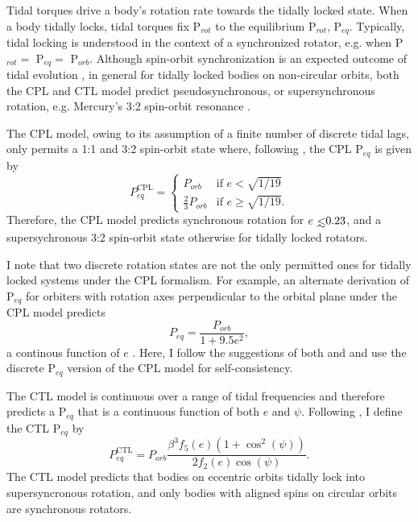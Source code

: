 Tidal torques drive a body's rotation rate towards the tidally locked state. When a body tidally locks, tidal torques fix P$_{rot}$ to the equilibrium P$_{rot}$, P$_{eq}$.  Typically, tidal locking is understood in the context of a synchronized rotator, e.g. when P$_{rot} = $ P$_{eq} = $ P$_{orb}$. Although spin-orbit synchronization is an expected outcome of tidal evolution \citep{Counselman1973}, in general for tidally locked bodies on non-circular orbits, both the CPL and CTL model predict pseudosynchronous, or supersynchronous rotation, e.g. Mercury's 3:2 spin-orbit resonance \citep[P$_{rot} = 2/3$ P$_{orb}$,][]{GoldreichPeale1966}.   

The CPL model, owing to its assumption of a finite number of discrete tidal lags, only permits a 1:1 and 3:2 spin-orbit state where, following \citet{Barnes2017}, the CPL P$_{eq}$ is given by
\begin{equation} \label{sync:eqn:cpl:eqPer}
P^{\mathrm{CPL}}_{eq} = 
\begin{cases}
P_{orb} & \text{if } e < \sqrt{1/19}\\
\frac{2}{3}P_{orb} & \text{if } e \geq \sqrt{1/19}.
\end{cases}
\end{equation}
Therefore, the CPL model predicts synchronous rotation for $e \lsim 0.23$, and a supersychronous 3:2 spin-orbit state otherwise for tidally locked rotators.

I note that two discrete rotation states are not the only permitted ones for tidally locked systems under the CPL formalism. For example, an alternate derivation of P$_{eq}$ for orbiters with rotation axes perpendicular to the orbital plane under the CPL model predicts
\begin{equation} \label{sync:eqn:cpl:eqPerCont}
P_{eq} = \frac{P_{orb}}{1 + 9.5e^2},
\end{equation}
a continous function of $e$ \citep{Goldreich1966b,Murray1999}. Here, I follow the suggestions of both \citet{Barnes2013} and \citet{Barnes2017} and use the discrete P$_{eq}$ version of the CPL model for self-consistency.

The CTL model is continuous over a range of tidal frequencies and therefore predicts a P$_{eq}$ that is a continuous function of both $e$ and $\psi$.  Following \citet{Barnes2017}, I define the CTL P$_{eq}$ by
\begin{equation} \label{sync:eqn:ctl:eqPer}
P^{\mathrm{CTL}}_{eq} = P_{orb} \frac{\beta^3 f_5(e) (1 + \cos^2(\psi))}{2f_2(e) \cos(\psi)}.
\end{equation}
The CTL model predicts that bodies on eccentric orbits tidally lock into supersyncronous rotation, and only bodies with aligned spins on circular orbits are synchronous rotators. 

